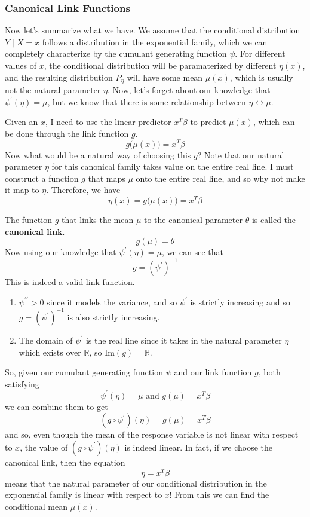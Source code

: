\documentclass{article}
\begin{document}
    \subsubsection{Canonical Link Functions}

      Now let's summarize what we have. We assume that the conditional distribution $Y \mid X = x$ follows a distribution in the exponential family, which we can completely characterize by the cumulant generating function $\psi$. For different values of $x$, the conditional distribution will be paramaterized by different $\eta (x)$, and the resulting distribution $P_\eta$ will have some mean $\mu(x)$, which is usually not the natural parameter $\eta$. Now, let's forget about our knowledge that $\psi^\prime(\eta) = \mu$, but we know that there is some relationship between $\eta \leftrightarrow \mu$.

      Given an $x$, I need to use the linear predictor $x^T \beta$ to predict $\mu(x)$, which can be done through the link function $g$. 
      \[g\big( \mu(x) \big) = x^T \beta\]
      Now what would be a natural way of choosing this $g$? Note that our natural parameter $\eta$ for this canonical family takes value on the entire real line. I must construct a function $g$ that maps $\mu$ onto the entire real line, and so why not make it map to $\eta$. Therefore, we have 
      \[\eta(x) = g\big( \mu(x) \big) = x^T \beta\]

      \begin{definition}
      The function $g$ that links the mean $\mu$ to the canonical parameter $\theta$ is called the \textbf{canonical link}. 
      \[g(\mu) = \theta\]
      Now using our knowledge that $\psi^\prime(\eta) = \mu$, we can see that 
      \[g = (\psi^\prime)^{-1}\]
      This is indeed a valid link function. 
      \begin{enumerate}
          \item $\psi^{\prime\prime} > 0$ since it models the variance, and so $\psi^\prime$ is strictly increasing and so $g = (\psi^\prime)^{-1}$ is also strictly increasing. 
          \item The domain of $\psi^\prime$ is the real line since it takes in the natural parameter $\eta$ which exists over $\mathbb{R}$, so $\mathrm{Im}(g) = \mathbb{R}$. 
      \end{enumerate}
      \end{definition}

      So, given our cumulant generating function $\psi$ and our link function $g$, both satisfying 
      \[\psi^\prime (\eta) = \mu \text{ and } g(\mu) = x^T \beta\]
      we can combine them to get 
      \[(g \circ \psi^\prime) (\eta) = g(\mu) = x^T \beta\]
      and so, even though the mean of the response variable is not linear with respect to $x$, the value of $(g \circ \psi^\prime) (\eta)$ is indeed linear. In fact, if we choose the canonical link, then the equation 
      \[\eta = x^T \beta\]
      means that the natural parameter of our conditional distribution in the exponential family is linear with respect to $x$! From this we can find the conditional mean $\mu(x)$. 
\end{document}
